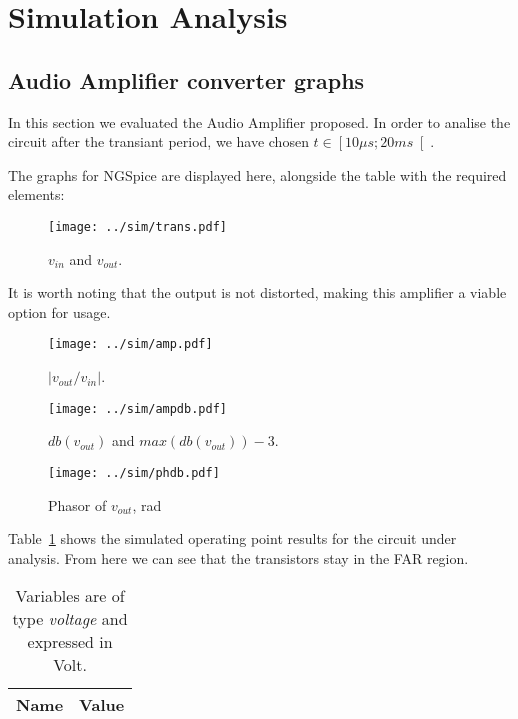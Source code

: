 \section{Simulation Analysis }
\label{sec:simulation}

\subsection{Audio Amplifier converter graphs}

In this section we evaluated the Audio Amplifier proposed.
In order to analise the circuit after the transiant period, we have chosen $t \in \left[ 10 \mu s; 20 ms \right[ $.

The graphs for NGSpice are displayed here, alongside the table with the required elements:

\begin{figure}[h] 
	\centering
	\vspace{-3cm}
	\texttt{[image: ../sim/trans.pdf]}
	\caption{$v_{in}$ and $v_{out}$.}
	\label{fig:SIM_TRANS}
\end{figure}

It is worth noting that the output is not distorted, making this amplifier a viable option for usage.

\begin{figure}[h] \centering
	\vspace{-3cm}
	\texttt{[image: ../sim/amp.pdf]}
	\caption{$ \left | v_{out}/v_{in} \right |$.}
\end{figure}

\newpage

\begin{figure}[h] \centering
	\vspace{-3cm}
	\texttt{[image: ../sim/ampdb.pdf]}
	\caption{$db(v_{out})$ and $max(db(v_{out}))-3$.}
\end{figure}

\begin{figure}[h] \centering
	\vspace{-3cm}
	\texttt{[image: ../sim/phdb.pdf]}
	\caption{Phasor of $v_{out}$, rad}
\end{figure}

\newpage

Table~\ref{tab:SIM_DC} shows the simulated operating point results for the circuit under analysis. From here we can see that the transistors stay in the FAR region.
\begin{table}[h]
  \centering
  \begin{tabular}{|l|r|}
    \hline    
    {\bf Name} & {\bf Value} \\ \hline
    
  \end{tabular}
  \caption{Variables are of type {\it voltage} and expressed in Volt.}
  \label{tab:SIM_DC}
\end{table}


